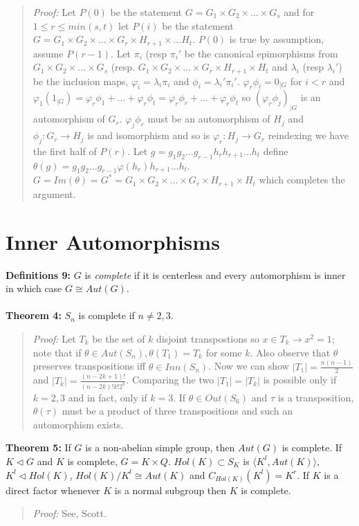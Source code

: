 \begin{quote}
\emph{Proof:}  
Let $P(0)$ be the statement
$G= G_1 \times G_2 \times \ldots \times G_s$ and for $1 \le r \le min(s,t)$
let $P(i)$ be the statement
$G= G_1 \times G_2 \times \ldots \times G_r \times H_{r+1} \times \ldots H_t$.
$P(0)$ is true by assumption, assume $P(r-1)$.  Let $\pi_i$ (resp $\pi_i'$ be the 
canonical epimorphisms from
$G_1 \times G_2 \times \ldots \times G_s$ (resp.
$G_1 \times G_2 \times \ldots \times G_r \times H_{r+1} \times H_t$ and $\lambda_i$
(resp $\lambda_i'$) be the inclusion maps, 
$\varphi_i= \lambda_i \pi_i$
and
$\phi_i= \lambda_i' \pi_i'$.  $\varphi_r \phi_i= 0_{|G}$ for $i<r$ and
$\varphi_1 (1_{|G})= \varphi_r \phi_1 + \ldots + \varphi_r \phi_t=
\varphi_r \phi_r + \ldots + \varphi_r \phi_t$ so $(\varphi_r \phi_j)_{|G}$ is
an automorphism of $G_r$.  $\varphi_j \phi_r$ must be an automorphism of $H_j$ and
$\phi_j:G_r \rightarrow H_j$ is and isomorphism and so is $\varphi_r: H_j \rightarrow G_r$
reindexing we have the first half of $P(r)$.  Let 
$g=g_1 g_2 \ldots g_{r-1} h_r h_{r+1} \ldots h_t$ define 
$\theta(g)=g_1 g_2 \ldots g_{r-1} \varphi(h_r) h_{r+1} \ldots h_t$.  
$G=Im(\theta)=G^*= G_1 \times G_2 \times \ldots \times G_r \times H_{r+1} \times H_t$ 
which completes the argument.
\end{quote}
\section {Inner Automorphisms}
{\bf Definitions 9:} $G$ is \emph{complete} if it is centerless and every automorphism is inner
in which case $G \cong Aut(G)$.
\\
\\
{\bf Theorem 4:} $S_n$ is complete if $n \ne 2,3$.
\begin{quote}
\emph{Proof:}
Let $T_k$ be the set of $k$ disjoint transpostions so $x \in T_k \rightarrow
x^2=1$; note that if $\theta \in Aut(S_n), \theta(T_1)= T_k$ for some $k$. Also
observe that $\theta$ preserves transpositions iff $\theta \in Inn(S_n)$.
Now we can show 
$|T_1|= {\frac {n(n-1)} {2}}$ and
$|T_k|= {\frac {(n-2k+1)!} {(n-2k)! k! 2^k}}$.  Comparing the two $|T_1| = |T_k|$
is possible only if $k=2 ,3$ and in fact, only if $k=3$.   If
$\theta \in Out(S_6)$ and $\tau$ is a transposition, $\theta(\tau)$ must
be a product of three transpositions and such an automorphism exists.
\end{quote}
{\bf Theorem 5:}
If $G$ is a non-abelian simple group, then $Aut(G)$ is complete.  If
$K \lhd G$ and $K$ is complete, $G= K \times Q$.  $Hol(K) \subset S_K$
is $ \langle K^l, Aut(K) \rangle $, $K^l \lhd Hol(K)$, $Hol(K)/K^l \cong Aut(K)$ and
$C_{Hol(K)}(K^l)= K^r$.  If $K$ is a direct factor whenever $K$ is a normal
subgroup then $K$ is complete.
\begin{quote}
\emph{Proof:}
See, Scott.
\end{quote}
